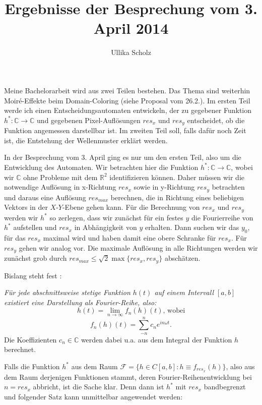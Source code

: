 \documentclass[a4paper]{article}
\begin{document}
\title{Ergebnisse der Besprechung vom 3. April 2014}
\date{}
\author{Ullika Scholz}
\maketitle
\thispagestyle{empty}
\setlength{\parskip}{6pt}

Meine Bachelorarbeit wird aus zwei Teilen bestehen. Das Thema sind weiterhin Moiré-Effekte beim Domain-Coloring (siehe Proposal vom 26.2.). Im ersten Teil werde ich einen Entscheidungsautomaten entwickeln, der zu gegebener Funktion $h^*: \mathbb{C} \rightarrow \mathbb{C}$ und gegebenen Pixel-Auflösungen $res_x$ und $res_y$ entscheidet, ob die Funktion angemessen darstellbar ist. Im zweiten Teil soll, falls dafür noch Zeit ist, die Entstehung der Wellenmuster erklärt werden.

In der Besprechung vom 3. April ging es nur um den ersten Teil, also um die Entwicklung des Automaten. Wir betrachten hier die Funktion $h^*: \mathbb{C} \rightarrow \mathbb{C}$, wobei wir $\mathbb{C}$ ohne Probleme mit dem $\mathbb{R}^2$ identifizieren können. Daher müssen wir die notwendige Auflösung in x-Richtung $res_x$ sowie in y-Richtung $res_y$ betrachten und daraus eine Auflösung $res_{max}$ berechnen, die in Richtung eines beliebigen Vektors in der $X$-$Y$-Ebene gehen kann.
Für die Berechnung von $res_x$ und $res_y$ werden wir $h^*$ so zerlegen, dass wir zunächst für ein festes $y$ die Fourierreihe von $h^*$ aufstellen und $res_x$ in Abhängigkeit von $y$ erhalten. Dann suchen wir das $y_0$, für das $res_x$ maximal wird und haben damit eine obere Schranke für $res_x$.
Für $res_y$ gehen wir analog vor. Die maximale Auflösung in alle Richtungen werden wir zunächst grob durch $res_{max} \leq \sqrt{2} \max \{ res_x, res_y \} $ abschätzen.

Bislang steht fest \cite[vgl.][]{MuellerWichards1999}:

\textit{Für jede abschnittsweise stetige Funktion $h(t)$ auf einem Intervall $[a,b]$ existiert eine Darstellung als Fourier-Reihe, also:}
$$h(t)=\lim\limits_{n \rightarrow \infty} f_n(h)(t) \text{, wobei}$$
$$f_n(h)(t)=\sum\limits_{-n}^{n} c_n e^{in \omega t}.$$
Die Koeffizienten $c_n \in \mathbb{C}$ werden dabei u.a. aus dem Integral der Funktion $h$ berechnet.

Falls die Funktion $h^*$ aus dem Raum $\mathcal{F}=\{h \in C[a,b]: h \equiv f_{res_x}(h) \}$, also aus dem Raum derjenigen Funktionen stammt, deren Fourier-Reihenentwicklung bei $n=res_x$ abbricht, ist die Sache klar. Denn dann ist $h^*$ mit $res_x$ bandbegrenzt und folgender Satz kann unmittelbar angewendet werden:
\end{document}
